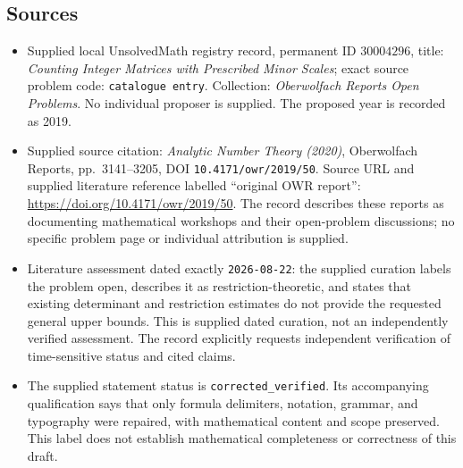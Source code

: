 \documentclass[11pt]{article}
\begin{document}
\subsection{Sources}
\begin{itemize}
\item Supplied local UnsolvedMath registry record, permanent ID \(30004296\), title: \emph{Counting Integer Matrices with Prescribed Minor Scales}; exact source problem code: \texttt{catalogue entry}. Collection: \emph{Oberwolfach Reports Open Problems}. No individual proposer is supplied. The proposed year is recorded as 2019.
\item Supplied source citation: \emph{Analytic Number Theory (2020)}, Oberwolfach Reports, pp.\ 3141--3205, DOI \texttt{10.4171/owr/2019/50}. Source URL and supplied literature reference labelled ``original OWR report'': \url{https://doi.org/10.4171/owr/2019/50}. The record describes these reports as documenting mathematical workshops and their open-problem discussions; no specific problem page or individual attribution is supplied.
\item Literature assessment dated exactly \texttt{2026-08-22}: the supplied curation labels the problem open, describes it as restriction-theoretic, and states that existing determinant and restriction estimates do not provide the requested general upper bounds. This is supplied dated curation, not an independently verified assessment. The record explicitly requests independent verification of time-sensitive status and cited claims.
\item The supplied statement status is \texttt{corrected\_verified}. Its accompanying qualification says that only formula delimiters, notation, grammar, and typography were repaired, with mathematical content and scope preserved. This label does not establish mathematical completeness or correctness of this draft.
\end{itemize}
\end{document}
